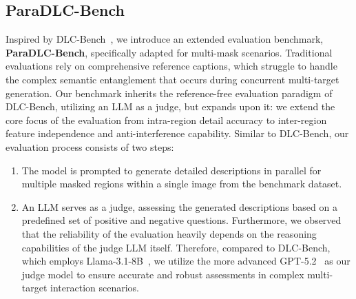 \documentclass{llmxive}
\begin{document}




%
\vspace{-2mm}
\subsection{ParaDLC-Bench}
\vspace{-2mm}
Inspired by DLC-Bench~\citep{lian2025describe}, we introduce an extended evaluation benchmark, \textbf{ParaDLC-Bench}, specifically adapted for multi-mask scenarios. Traditional evaluations rely on comprehensive reference captions, which struggle to handle the complex semantic entanglement that occurs during concurrent multi-target generation. 
%
Our benchmark inherits the reference-free evaluation paradigm of DLC-Bench, utilizing an LLM as a judge, but expands upon it: we extend the core focus of the evaluation from intra-region detail accuracy to inter-region feature independence and anti-interference capability.
%
Similar to DLC-Bench, our evaluation process consists of two steps:
\begin{enumerate}
    \item The model is prompted to generate detailed descriptions in parallel for multiple masked regions within a single image from the benchmark dataset.
    \item An LLM serves as a judge, assessing the generated descriptions based on a predefined set of positive and negative questions. 
    Furthermore, we observed that the reliability of the evaluation heavily depends on the reasoning capabilities of the judge LLM itself. Therefore, compared to DLC-Bench, which employs Llama-3.1-8B~\citep{grattafiori2024llama}, we utilize the more advanced GPT-5.2~\citep{gpt5.2} as our judge model to ensure accurate and robust assessments in complex multi-target interaction scenarios.
\end{enumerate}
\end{document}
